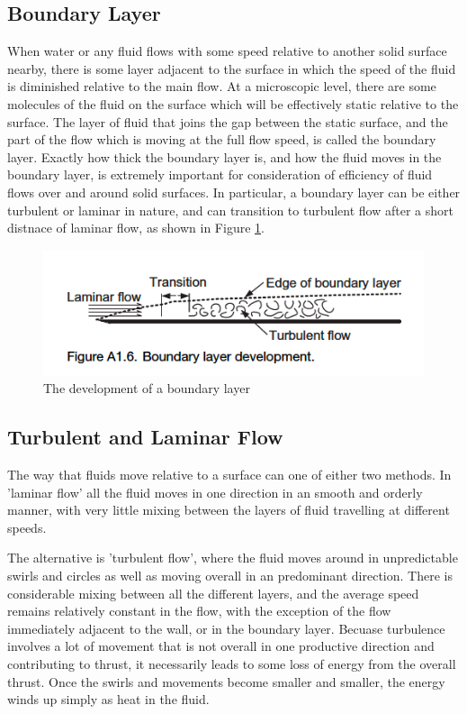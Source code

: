 \documentclass{article}\usepackage[]{graphicx}\usepackage[]{color}
\begin{document}
\subsection{Boundary Layer}

When water or any fluid flows with some speed relative to another solid surface nearby, there is some layer adjacent to the surface in which the speed of the fluid is diminished relative to the main flow.  At a microscopic level, there are some molecules of the fluid on the surface which will be effectively static relative to the surface.  The layer of fluid that joins the gap between the static surface, and the part of the flow which is moving at the full flow speed, is called the boundary layer.  Exactly how thick the boundary layer is, and how the fluid moves in the boundary layer, is extremely important for consideration of efficiency of fluid flows over and around solid surfaces.  In particular, a boundary layer can be either turbulent or laminar in nature, and can transition to turbulent flow after a short distnace of laminar flow, as shown in Figure \ref{fig:BoundaryLayer.png}.

\begin{figure}
\includegraphics[width=\textwidth]{BoundaryLayer.png}
\caption{The development of a boundary layer \parencite{mollard2011}}
\label{fig:BoundaryLayer.png}
\end{figure}


\subsection{Turbulent and Laminar Flow}

The way that fluids move relative to a surface can one of either two methods.  In 'laminar flow' all the fluid moves in one direction in an smooth and orderly manner, with very little mixing between the layers of fluid travelling at different speeds.

The alternative is 'turbulent flow', where the fluid moves around in unpredictable swirls and circles as well as moving overall in an predominant direction.  There is considerable mixing between all the different layers, and the average speed remains relatively constant in the flow, with the exception of the flow immediately adjacent to the wall, or in the boundary layer.  Becuase turbulence involves a lot of movement that is not overall in one productive direction and contributing to thrust, it necessarily leads to some loss of energy from the overall thrust.  Once the swirls and movements become smaller and smaller, the energy winds up simply as heat in the fluid.
\end{document}
